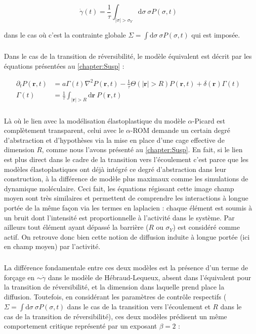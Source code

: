\begin{equation}
	\dot{\gamma} (t) = \frac{1}{\tau}\int_{|\sigma|>\sigma_Y}\mathrm{d}\sigma ~ \sigma P(\sigma, t)
\end{equation}

\noindent dans le cas où c'est la contrainte globale $\Sigma = \int \mathrm{d}\sigma ~ \sigma P(\sigma,t)$ qui est imposée.

\subparagraph{}Dans le cas de la transition de réversibilité, le modèle équivalent est décrit par les équations présentées au \autoref{chapter:Susp} :

\begin{equation}
\begin{aligned}
    \partial_t P(\mathbf{r}, t) &= a\Gamma (t)\nabla^2 P(\mathbf{r}, t) - \frac{1}{\tau}\Theta(|\mathbf{r}|>R)P(\mathbf{r}, t) + \delta(\mathbf{r})\Gamma (t)\\
     \Gamma (t) &= \frac{1}{\tau}\int_{|\mathbf{r}|>R}\mathrm{d}\mathbf{r}~P(\mathbf{r}, t)
    \label{eq:muHLDiffdisc}
\end{aligned}
\end{equation} 

\subparagraph{}Là où le lien avec la modélisation élastoplastique du modèle $\alpha$-Picard est complètement transparent, celui avec le $\alpha$-ROM demande un certain degré d'abstraction et d'hypothèses via la mise en place d'une cage effective de dimension $R$, comme nous l'avons présenté au \autoref{chapter:Susp}. En fait, si le lien est plus direct dans le cadre de la transition vers l'écoulement c'est parce que les modèles élastoplastiques ont déjà intégré ce degré d'abstraction dans leur construction, à la différence de modèle plus maximaux comme les simulations de dynamique moléculaire. Ceci fait, les équations régissant cette image champ moyen sont très similaires et permettent de comprendre les interactions à longue portée de la même façon via les termes en laplacien : chaque élément est soumis à un bruit dont l'intensité est proportionnelle à l'activité dans le système. Par ailleurs tout élément ayant dépassé la barrière ($R$ ou $\sigma_Y$) est considéré comme actif. On retrouve donc bien cette notion de diffusion induite à longue portée (ici en champ moyen) par l'activité.

\subparagraph{}La différence fondamentale entre ces deux modèles est la présence d'un terme de forçage en $\sim \dot{\gamma}$ dans le modèle de Hébraud-Lequeux, absent dans l'équivalent pour la transition de réversibilité, et la dimension dans laquelle prend place la diffusion. Toutefois, en considérant les paramètres de contrôle respectifs ($\Sigma = \int \mathrm{d}\sigma ~ \sigma P(\sigma,t)$ dans le cas de la transition vers l'écoulement et $R$ dans le cas de la transition de réversibilité), ces deux modèles prédisent un même comportement critique représenté par un exposant $\beta = 2$ :

